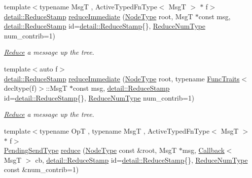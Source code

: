 \begin{DoxyCompactItemize}
\item 
{\footnotesize template$<$typename MsgT , Active\+Typed\+Fn\+Type$<$ Msg\+T $>$ $\ast$ f$>$ }\\\hyperlink{namespacevt_1_1collective_1_1reduce_1_1detail_aacc1fcd729d934ba143fee3a943bf9e7}{detail\+::\+Reduce\+Stamp} \hyperlink{structvt_1_1collective_1_1reduce_1_1_reduce_ae21e839a2347ee8ac5ee37c09ff6f4ff}{reduce\+Immediate} (\hyperlink{namespacevt_a866da9d0efc19c0a1ce79e9e492f47e2}{Node\+Type} root, MsgT $\ast$const msg, \hyperlink{namespacevt_1_1collective_1_1reduce_1_1detail_aacc1fcd729d934ba143fee3a943bf9e7}{detail\+::\+Reduce\+Stamp} id=\hyperlink{namespacevt_1_1collective_1_1reduce_1_1detail_aacc1fcd729d934ba143fee3a943bf9e7}{detail\+::\+Reduce\+Stamp}\{\}, \hyperlink{structvt_1_1collective_1_1reduce_1_1_reduce_a6c3e63aca10c31d2823b0b18cf9762a4}{Reduce\+Num\+Type} num\+\_\+contrib=1)
\begin{DoxyCompactList}\small\item\em \hyperlink{structvt_1_1collective_1_1reduce_1_1_reduce}{Reduce} a message up the tree. \end{DoxyCompactList}\item 
{\footnotesize template$<$auto f$>$ }\\\hyperlink{namespacevt_1_1collective_1_1reduce_1_1detail_aacc1fcd729d934ba143fee3a943bf9e7}{detail\+::\+Reduce\+Stamp} \hyperlink{structvt_1_1collective_1_1reduce_1_1_reduce_af5e43f2caafa73dd5941c13857e97a7e}{reduce\+Immediate} (\hyperlink{namespacevt_a866da9d0efc19c0a1ce79e9e492f47e2}{Node\+Type} root, typename \hyperlink{structvt_1_1_func_traits}{Func\+Traits}$<$ decltype(f)$>$\+::MsgT $\ast$const msg, \hyperlink{namespacevt_1_1collective_1_1reduce_1_1detail_aacc1fcd729d934ba143fee3a943bf9e7}{detail\+::\+Reduce\+Stamp} id=\hyperlink{namespacevt_1_1collective_1_1reduce_1_1detail_aacc1fcd729d934ba143fee3a943bf9e7}{detail\+::\+Reduce\+Stamp}\{\}, \hyperlink{structvt_1_1collective_1_1reduce_1_1_reduce_a6c3e63aca10c31d2823b0b18cf9762a4}{Reduce\+Num\+Type} num\+\_\+contrib=1)
\begin{DoxyCompactList}\small\item\em \hyperlink{structvt_1_1collective_1_1reduce_1_1_reduce}{Reduce} a message up the tree. \end{DoxyCompactList}\item 
{\footnotesize template$<$typename OpT , typename MsgT , Active\+Typed\+Fn\+Type$<$ Msg\+T $>$ $\ast$ f$>$ }\\\hyperlink{structvt_1_1collective_1_1reduce_1_1_reduce_a0474b491f3c93014d9a0ce0356c6bfd5}{Pending\+Send\+Type} \hyperlink{structvt_1_1collective_1_1reduce_1_1_reduce_a3630a98801fa91fd9a0e5ffdf8731650}{reduce} (\hyperlink{namespacevt_a866da9d0efc19c0a1ce79e9e492f47e2}{Node\+Type} const \&root, MsgT $\ast$msg, \hyperlink{namespacevt_a57b238783d05de96bc2c4027f7073b7f}{Callback}$<$ MsgT $>$ cb, \hyperlink{namespacevt_1_1collective_1_1reduce_1_1detail_aacc1fcd729d934ba143fee3a943bf9e7}{detail\+::\+Reduce\+Stamp} id=\hyperlink{namespacevt_1_1collective_1_1reduce_1_1detail_aacc1fcd729d934ba143fee3a943bf9e7}{detail\+::\+Reduce\+Stamp}\{\}, \hyperlink{structvt_1_1collective_1_1reduce_1_1_reduce_a6c3e63aca10c31d2823b0b18cf9762a4}{Reduce\+Num\+Type} const \&num\+\_\+contrib=1)

\end{DoxyCompactItemize}
